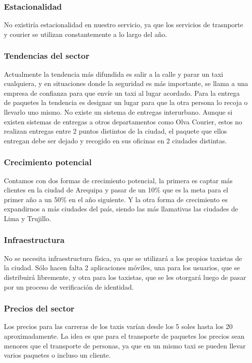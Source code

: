 \subsubsection{Estacionalidad}
No existiría estacionalidad en nuestro servicio, ya que los servicios de trasnporte y courier se utilizan constantemente a lo largo del año.

\subsubsection{Tendencias del sector}
Actualmente la tendencia más difundida es salir a la calle y parar un taxi cualquiera, y en situaciones donde la seguridad es más importante, se llama a una empresa de confianza para que envíe un taxi al lugar acordado. Para la entrega de paquetes la tendencia es designar un lugar para que la otra persona lo recoja o llevarlo uno mismo. No existe un sistema de entregas interurbano. Aunque si existen sistemas de entregas a otros departamentos como Olva Courier, estos no realizan entregas entre 2 puntos distintos de la ciudad, el paquete que ellos entregan debe ser dejado y recogido en sus oficinas en 2 ciudades distintas.

\subsubsection{Crecimiento potencial}
Contamos con dos formas de crecimiento potencial, la primera es captar más clientes en la ciudad de Arequipa y pasar de un 10\% que es la meta para el primer año a un 50\% en el año siguiente. Y la otra forma de crecimiento es expandirnos a más ciudades del país, siendo las más llamativas las ciudades de Lima y Trujillo.

\subsubsection{Infraestructura}
No se necesita infraestructura física, ya que se utilizará a los propios taxistas de la ciudad. Sólo hacen falta 2 aplicaciones móviles, una para los usuarios, que se distribuirá libremente, y otra para los taxistas, que se les otorgará luego de pasar por un proceso de verificación de identidad.

\subsubsection{Precios del sector}
Los precios para las carreras de los taxis varían desde los 5 soles hasta los 20 aproximadamente. La idea es que para el transporte de paquetes los precios sean menores que el transporte de personas, ya que en un mismo taxi se pueden llevar varios paquetes o incluso un cliente.

